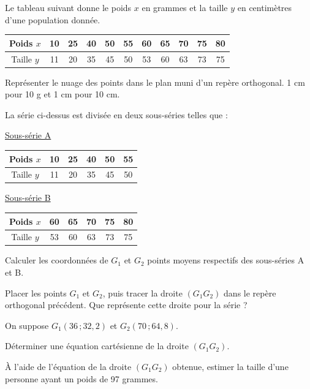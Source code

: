 \documentclass[11pt]{article}
\begin{document}
Le tableau suivant donne le poids $x$ en grammes et la taille $y$ en centimètres d'une population donnée.
\begin{center}\renewcommand{\arraystretch}{1.4}
\begin{tabular}{|c|c|c|c|c|c|c|c|c|c|c|}
\hline
Poids $x$ & 10 & 25 & 40 & 50 & 55 & 60 & 65 & 70 & 75 & 80 \\
\hline
Taille $y$ & 11 & 20 & 35 & 45 & 50 & 53 & 60 & 63 & 73 & 75 \\
\hline
\end{tabular}
\end{center}
\begin{questions}
  \item Représenter le nuage des points dans le plan muni d'un repère orthogonal. 1 cm pour 10 g et 1 cm pour 10 cm.
  \item La série ci-dessus est divisée en deux sous-séries telles que :

  \underline{Sous-série A}
  \begin{center}\renewcommand{\arraystretch}{1.4}
  \begin{tabular}{|c|c|c|c|c|c|}
  \hline Poids $x$ & 10 & 25 & 40 & 50 & 55 \\\hline Taille $y$ & 11 & 20 & 35 & 45 & 50 \\\hline
  \end{tabular}\end{center}

  \underline{Sous-série B}
  \begin{center}\renewcommand{\arraystretch}{1.4}
  \begin{tabular}{|c|c|c|c|c|c|}
  \hline Poids $x$ & 60 & 65 & 70 & 75 & 80 \\\hline Taille $y$ & 53 & 60 & 63 & 73 & 75 \\\hline
  \end{tabular}\end{center}
  \begin{sousq}
    \item Calculer les coordonnées de $G_1$ et $G_2$ points moyens respectifs des sous-séries A et B.
    \item Placer les points $G_1$ et $G_2$, puis tracer la droite $(G_1G_2)$ dans le repère orthogonal précédent. Que représente cette droite pour la série ?
  \end{sousq}
  \item On suppose $G_1(36\,;32{,}2)$ et $G_2(70\,;64{,}8)$.
  \begin{sousq}
    \item Déterminer une équation cartésienne de la droite $(G_1G_2)$.
    \item À l'aide de l'équation de la droite $(G_1G_2)$ obtenue, estimer la taille d'une personne ayant un poids de 97 grammes.
  \end{sousq}
\end{questions}
\end{document}
